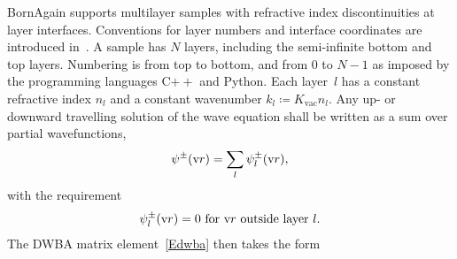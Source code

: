 BornAgain supports multilayer samples
with refractive index discontinuities at layer interfaces.
Conventions for layer numbers and interface coordinates are introduced in~.
%
%
%
%
%
A sample has $N$ layers,
including the semi-infinite bottom and top layers.
Numbering is from top to bottom,
and from 0 to $N-1$ as imposed by the programming languages C$++$ and Python.
Each layer~$l$
%
has a constant refractive index $n_l$
%
%
and a constant wavenumber $k_l\coloneqq K_\text{vac} n_l$.
Any up- or downward travelling solution of the wave equation shall be written
as a sum over partial wavefunctions,
\begin{equation}\label{Epsipmsuml}
  \psi^\pm(\text{v}{r}) = \sum_l \psi_l^\pm(\text{v}{r}),
\end{equation}
with the requirement
\begin{equation}\label{Epsipmloutside}
   \psi_l^\pm(\text{v}{r}) = 0 \text{~for $\text{v}{r}$ outside layer~$l$.}
\end{equation}
The DWBA matrix element~\cref{Edwba} then takes the form

